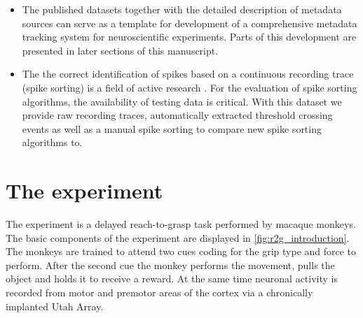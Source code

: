 \begin{itemize}
 \item The published datasets together with the detailed description of metadata sources can serve as a template for development of a comprehensive metadata tracking system for neuroscientific experiments. Parts of this development are presented in later sections of this manuscript.
 \item The the correct identification of spikes based on a continuous recording trace (spike sorting) is a field of active research \citep{Rey_2015, Lefebvre_2016, Sukiban_2019}. For the evaluation of spike sorting algorithms, the availability of testing data is critical. With this dataset we provide raw recording traces, automatically extracted threshold crossing events as well as a manual spike sorting to compare new spike sorting algorithms to.
\end{itemize}


\section{The experiment}
The experiment is a delayed reach-to-grasp task performed by macaque monkeys. The basic components of the experiment are displayed in \cref{fig:r2g_introduction}. The monkeys are trained to attend two cues coding for the grip type and force to perform. After the second cue the monkey performs the movement, pulls the object and holds it to receive a reward. At the same time neuronal activity is recorded from motor and premotor areas of the cortex via a chronically implanted Utah Array. 

